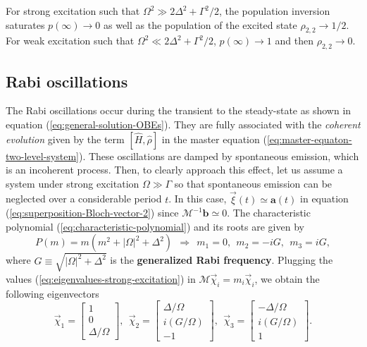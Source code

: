 For strong excitation such that $ \Omega^2 \gg 2\Delta^2 + \Gamma^2 / 2 $, the population inversion saturates $ p(\infty) \rightarrow 0 $ as well as the population of the excited state $ \rho_{2,2} \rightarrow 1/2 $. For weak excitation such that $ \Omega^2 \ll 2\Delta^2 + \Gamma^2 / 2$, $ p(\infty) \rightarrow 1 $ and then $ \rho_{2,2} \rightarrow 0 $.

\subsection{Rabi oscillations}
\label{sec:Rabi-oscillations}

The Rabi oscillations occur during the transient to the steady-state as shown in equation (\ref{eq:general-solution-OBEs}). They are fully associated with the \textit{coherent evolution} given by the term $ [\hat{H}, \hat{\rho}] $ in the master equation (\ref{eq:master-equaton-two-level-system}). These oscillations are damped by spontaneous emission, which is an incoherent process. Then, to clearly approach this effect, let us assume a system under strong excitation $ \Omega \gg \Gamma $ so that spontaneous emission can be neglected over a considerable period $ t $. In this case, $\vec{\xi}(t) \simeq \mathbf{a}(t) $ in equation (\ref{eq:superposition-Bloch-vector-2}) since $ \mathcal{M}^{-1} \mathbf{b} \simeq 0 $. The characteristic polynomial (\ref{eq:characteristic-polynomial}) and its roots are given by
\begin{equation}
	P(m) = m (m^2 + |\Omega|^2 + \Delta^2)\ \ \Rightarrow\ \ 
	m_1 = 0,\ \ m_2 = -iG,\ \ m_3 = iG,
	\label{eq:eigenvalues-strong-excitation}
\end{equation}
where $ G \equiv \sqrt{|\Omega|^2 + \Delta^2} $ is the \textbf{generalized Rabi frequency}. Plugging the values (\ref{eq:eigenvalues-strong-excitation}) in $ \mathcal{M}\vec{\chi}_i = m_i \vec{\chi}_i $, we obtain the following eigenvectors
\begin{equation}	
	\vec{\chi}_1 = \left[ \begin{matrix} 1 \\ 0 \\ \Delta / \Omega \end{matrix} \right],\ \ \vec{\chi}_2 =  \left[ \begin{matrix} \Delta / \Omega \\ i(G / \Omega) \\ -1 \end{matrix} \right],\ \ \vec{\chi}_3 =  \left[ \begin{matrix} -\Delta / \Omega \\ i(G / \Omega) \\ 1 \end{matrix} \right].
	\label{eq:eigenvectors-strong-excitation}
\end{equation}
